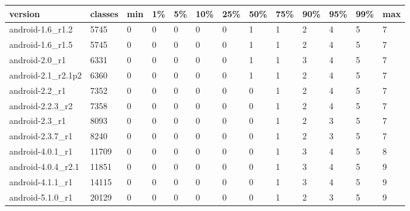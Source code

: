 \begin{tabular}{|l|l|l|l|l|l|l|l|l|l|l|l|l|}
\hline
version&classes&min&1\%&5\%&10\%&25\%&50\%&75\%&90\%&95\%&99\%&max\\
\hline
android-1.6\_r1.2&5745&0&0&0&0&0&1&1&2&4&5&7\\
\hline
android-1.6\_r1.5&5745&0&0&0&0&0&1&1&2&4&5&7\\
\hline
android-2.0\_r1&6331&0&0&0&0&0&1&1&3&4&5&7\\
\hline
android-2.1\_r2.1p2&6360&0&0&0&0&0&1&1&2&4&5&7\\
\hline
android-2.2\_r1&7352&0&0&0&0&0&0&1&2&4&5&7\\
\hline
android-2.2.3\_r2&7358&0&0&0&0&0&0&1&2&4&5&7\\
\hline
android-2.3\_r1&8093&0&0&0&0&0&0&1&2&3&5&7\\
\hline
android-2.3.7\_r1&8240&0&0&0&0&0&0&1&2&3&5&7\\
\hline
android-4.0.1\_r1&11709&0&0&0&0&0&0&1&3&4&5&8\\
\hline
android-4.0.4\_r2.1&11851&0&0&0&0&0&0&1&3&4&5&9\\
\hline
android-4.1.1\_r1&14115&0&0&0&0&0&0&1&3&4&5&9\\
\hline
android-5.1.0\_r1&20129&0&0&0&0&0&0&1&2&3&5&9\\
\hline
\end{tabular}
